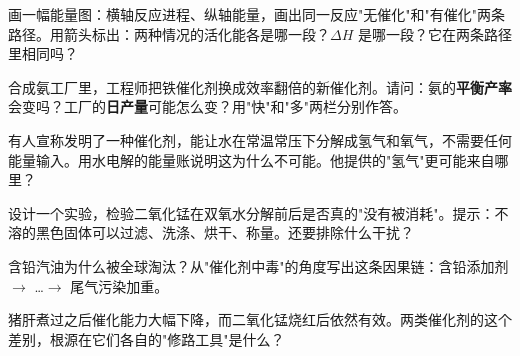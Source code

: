 \begin{sikaoti}
\item 画一幅能量图：横轴反应进程、纵轴能量，画出同一反应"无催化"和"有催化"两条路径。用箭头标出：两种情况的活化能各是哪一段？$\Delta H$ 是哪一段？它在两条路径里相同吗？
\item 合成氨工厂里，工程师把铁催化剂换成效率翻倍的新催化剂。请问：氨的\textbf{平衡产率}会变吗？工厂的\textbf{日产量}可能怎么变？用"快"和"多"两栏分别作答。
\item 有人宣称发明了一种催化剂，能让水在常温常压下分解成氢气和氧气，不需要任何能量输入。用水电解的能量账说明这为什么不可能。他提供的"氢气"更可能来自哪里？
\item 设计一个实验，检验二氧化锰在双氧水分解前后是否真的"没有被消耗"。提示：不溶的黑色固体可以过滤、洗涤、烘干、称量。还要排除什么干扰？
\item 含铅汽油为什么被全球淘汰？从"催化剂中毒"的角度写出这条因果链：含铅添加剂 $\rightarrow$ \dots $\rightarrow$ 尾气污染加重。
\item 猪肝煮过之后催化能力大幅下降，而二氧化锰烧红后依然有效。两类催化剂的这个差别，根源在它们各自的"修路工具"是什么？
\end{sikaoti}
